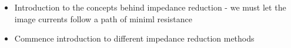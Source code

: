 \begin{itemize}
\item{Introduction to the concepts behind impedance reduction - we must let the image currents follow a path of miniml resistance}
\item{Commence introduction to different impedance reduction methods}
\end{itemize}